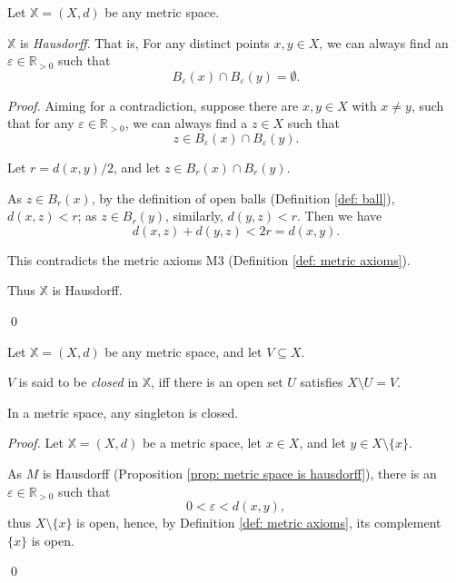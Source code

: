 \begin{proposition}
	\label{prop: metric space is hausdorff}
	Let $\mathbb X = (X, d)$ be any metric space.
	
	$\mathbb X$ is \textit{Hausdorff}. That is, For any distinct points $x,y \in X$, we can always find an $\varepsilon \in \mathbb R_{> 0}$ such that
	$$
	B_\varepsilon(x) \cap B_\varepsilon(y) = \emptyset.
	$$
	
	\begin{proof}
		Aiming for a contradiction, suppose there are $x,y \in X$ with $x \ne y$, such that for any $\varepsilon \in \mathbb R_{> 0}$, we can always find a $z \in X$ such that
		$$
		z \in B_\varepsilon(x) \cap B_\varepsilon(y).
		$$
		
		Let $r = d(x,y)/2$, and let $z \in B_r(x) \cap B_r(y)$.
		
		As $z \in B_r(x)$, by the definition of open balls (Definition \ref{def: ball}), $d(x,z) < r$; as $z \in B_r(y)$, similarly, $d(y,z)< r$. Then we have
		$$
		d(x, z) + d(y, z) < 2r = d(x,y).
		$$
		
		This contradicts the metric axioms M3 (Definition \ref{def: metric axioms}).
		
		Thus $\mathbb X$ is Hausdorff.
		
		\qed
	\end{proof}
\end{proposition}


\begin{definition}
	\label{def: closed set in metric space}
	Let $\mathbb X = (X, d)$ be any metric space, and let $V \subseteq X$.
	
	$V$ is said to be \textit{closed} in $\mathbb X$, iff there is an open set $U$ satisfies $X \setminus U = V$.
\end{definition}


\begin{proposition}
	\label{prop: singleton in metric space is closed}
	In a metric space, any singleton is closed.
	
	\begin{proof}
		Let $\mathbb X =(X, d)$ be a metric space, let $x \in X$, and let $y \in X \setminus \{x\}$.
		
		As $M$ is Hausdorff (Proposition \ref{prop: metric space is hausdorff}), there is an $\varepsilon \in \mathbb R_{> 0}$ such that
		$$
		0 < \varepsilon < d(x,y),
		$$
		thus $X \setminus \{x\}$ is open, hence, by Definition \ref{def: metric axioms}, its complement $\{x\}$ is open.
		
		\qed
	\end{proof}
\end{proposition}


